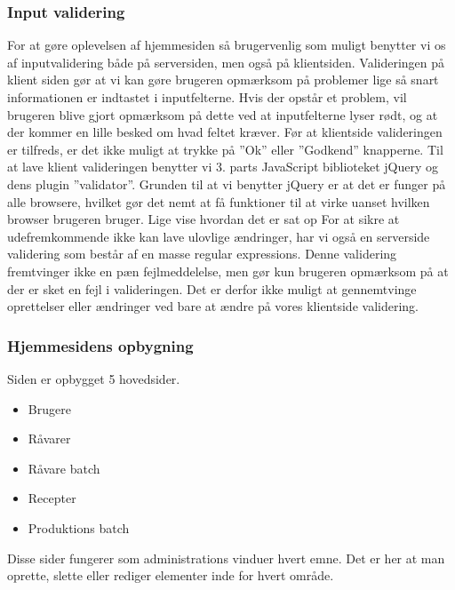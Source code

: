 \documentclass[a4paper]{article}
\begin{document}

\subsubsection{Input validering} %

For at gøre oplevelsen af hjemmesiden så brugervenlig som muligt benytter vi os af inputvalidering både på serversiden, men også på klientsiden. Valideringen på klient siden gør at vi kan gøre brugeren opmærksom på problemer lige så snart informationen er indtastet i inputfelterne. Hvis der opstår et problem, vil brugeren blive gjort opmærksom på dette ved at inputfelterne lyser rødt, og at der kommer en lille besked om hvad feltet kræver.  Før at klientside valideringen er tilfreds, er det ikke muligt at trykke på ”Ok” eller ”Godkend” knapperne.  
Til at lave klient valideringen benytter vi 3. parts JavaScript biblioteket  jQuery  og dens plugin ”validator”. Grunden til at vi benytter jQuery er at det er funger på alle browsere, hvilket gør det nemt at få funktioner til at virke uanset hvilken browser brugeren bruger. 
Lige vise hvordan det er sat op
For at sikre at udefremkommende ikke kan lave ulovlige ændringer, har vi også en serverside validering som består af en masse regular expressions. Denne validering fremtvinger ikke en pæn fejlmeddelelse, men gør kun brugeren opmærksom på at der er sket en fejl i valideringen. Det er derfor ikke muligt at gennemtvinge oprettelser eller ændringer ved bare at ændre på vores klientside validering. 


\subsubsection{Hjemmesidens opbygning} %

Siden er opbygget 5 hovedsider. 
\begin{itemize}
  \item Brugere
  \item Råvarer
  \item Råvare batch
  \item Recepter
  \item Produktions batch
\end{itemize}

Disse sider fungerer som administrations vinduer hvert emne.  Det er her at man oprette, slette eller rediger elementer inde for hvert område. 
\end{document}
